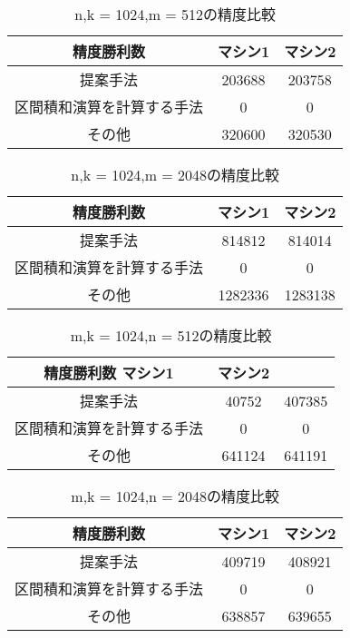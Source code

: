 \documentclass[11pt,a4paper]{jsreport}
\theoremstyle{definition}
\begin{document}
\begin{table}[H]
\centering
\small
\caption{n,k = 1024,m = 512の精度比較}
\begin{tabular}{c|c|c}
\hline
精度勝利数 & マシン1 & マシン2 \\ \hline \hline
提案手法 & 203688 & 203758 \\ \hline
区間積和演算を計算する手法 & 0 & 0 \\ \hline
その他 & 320600 & 320530 \\ \hline
\end{tabular}
\end{table}

\begin{table}[H]
\centering
\small
\caption{n,k = 1024,m = 2048の精度比較}
\begin{tabular}{c|c|c}
\hline
精度勝利数 & マシン1 & マシン2\\ \hline \hline
提案手法 & 814812 & 814014 \\ \hline
区間積和演算を計算する手法 & 0 & 0 \\ \hline
その他 & 1282336 & 1283138 \\ \hline
\end{tabular}
\end{table}

\begin{table}[H]
\centering
\small
\caption{m,k = 1024,n = 512の精度比較}
\begin{tabular}{c|c|c}
\hline
精度勝利数 マシン1 & マシン2 \\ \hline \hline
提案手法 & 40752 & 407385 \\ \hline
区間積和演算を計算する手法 & 0 & 0 \\ \hline
その他 & 641124 & 641191 \\ \hline
\end{tabular}
\end{table}

\begin{table}[H]
\centering
\small
\caption{m,k = 1024,n = 2048の精度比較}
\begin{tabular}{c|c|c}
\hline
精度勝利数 & マシン1 & マシン2 \\ \hline \hline
提案手法 & 409719 & 408921 \\ \hline
区間積和演算を計算する手法 & 0 & 0 \\ \hline
その他 & 638857 & 639655 \\ \hline
\end{tabular}
\end{table}
\end{document}
